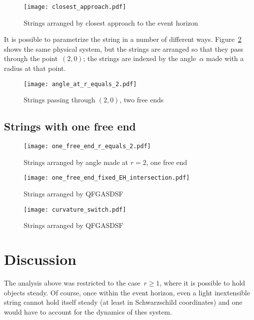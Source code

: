 \documentclass[prb,preprint]{revtex4-1}
\begin{document}
\begin{figure}[h!]
\centering
\texttt{[image: closest\_approach.pdf]}
\caption{Strings arranged by closest approach to the event horizon}
\label{closest_approach}
\end{figure}

It is possible to parametrize the string in a number of different
ways.  Figure~\ref{angle_at_r_equals_2} shows the same physical
system, but the strings are arranged so that they pass through the
point~$\left(2,0\right)$; the strings are indexed by the
angle~$\alpha$ made with a radius at that point.

\begin{figure}[h!]
\centering
\texttt{[image: angle\_at\_r\_equals\_2.pdf]}
\caption{Strings \label{angle_at_r_equals_2} passing through
  $\left(2,0\right)$, two free ends}
\end{figure}

\subsection{Strings with one free end}


\begin{figure}[h!]
\centering
\texttt{[image: one\_free\_end\_r\_equals\_2.pdf]}
\caption{Strings arranged by angle made at $r=2$, one free end}
\label{y}
\end{figure}

\begin{figure}[h!]
\centering
\texttt{[image: one\_free\_end\_fixed\_EH\_intersection.pdf]}
\caption{Strings arranged by QFGASDSF}
\label{fixed_EH_intersection}
\end{figure}

\begin{figure}[h!]
\centering
\texttt{[image: curvature\_switch.pdf]}
\caption{Strings arranged by QFGASDSF}
\label{curvature_switch}
\end{figure}



\section{Discussion}


The analysis above was restricted to the case~$r\geq 1$, where it is
possible to hold objects steady.  Of course, once within the event
horizon, even a light inextensible string cannot hold itself steady
(at least in Schwarzschild coordinates) and one would have to account
for the dynamics of thes system.
\end{document}
